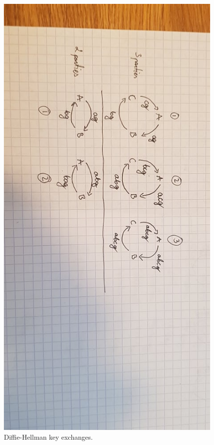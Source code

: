 \documentclass{article}
\begin{document}
\begin{figure}[H]
    \centering
    \label{fig:dh}
    \includegraphics[scale=0.5, angle=90]{dh.jpg}
    \caption{Diffie-Hellman key exchanges.}
\end{figure}


\end{document}
